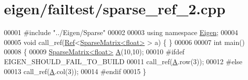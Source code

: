 \hypertarget{eigen_2failtest_2sparse__ref__2_8cpp_source}{}\section{eigen/failtest/sparse\+\_\+ref\+\_\+2.cpp}
\label{eigen_2failtest_2sparse__ref__2_8cpp_source}

\begin{DoxyCode}
00001 \textcolor{preprocessor}{#include "../Eigen/Sparse"}
00002 
00003 \textcolor{keyword}{using namespace }\hyperlink{namespace_eigen}{Eigen};
00004 
00005 \textcolor{keywordtype}{void} call\_ref(\hyperlink{group___core___module_class_eigen_1_1_ref}{Ref}<\hyperlink{group___sparse_core___module_class_eigen_1_1_sparse_matrix}{SparseMatrix<float>} > a) \{ \}
00006 
00007 \textcolor{keywordtype}{int} main()
00008 \{
00009   \hyperlink{group___sparse_core___module_class_eigen_1_1_sparse_matrix}{SparseMatrix<float>} \hyperlink{group___core___module_class_eigen_1_1_matrix}{A}(10,10);
00010 \textcolor{preprocessor}{#ifdef EIGEN\_SHOULD\_FAIL\_TO\_BUILD}
00011   call\_ref(\hyperlink{group___core___module_class_eigen_1_1_matrix}{A}.row(3));
00012 \textcolor{preprocessor}{#else}
00013   call\_ref(\hyperlink{group___core___module_class_eigen_1_1_matrix}{A}.col(3));
00014 \textcolor{preprocessor}{#endif}
00015 \}
\end{DoxyCode}
